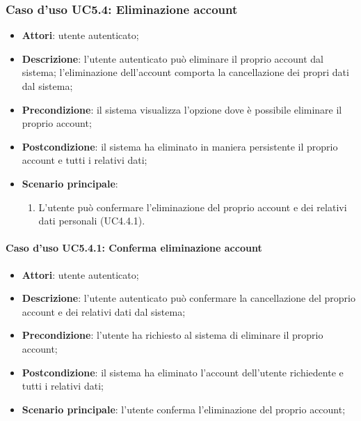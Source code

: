 \subsubsection{Caso d'uso UC5.4: Eliminazione account}

\begin{itemize}
	\item \textbf{Attori}: utente autenticato;
	\item \textbf{Descrizione}: l'utente autenticato può eliminare il proprio account dal sistema; l'eliminazione dell'account comporta la cancellazione dei propri dati dal sistema; 
	\item \textbf{Precondizione}: il sistema visualizza l'opzione dove è possibile eliminare il proprio account;
	\item \textbf{Postcondizione}: il sistema ha eliminato in maniera persistente il proprio account e tutti i relativi dati;
	\item \textbf{Scenario principale}:
		\begin{enumerate}
			\item L'utente può confermare l'eliminazione del proprio account e dei relativi dati personali (UC4.4.1).
		\end{enumerate}
\end{itemize}

\paragraph{Caso d'uso UC5.4.1: Conferma eliminazione account}

\begin{itemize}
	\item \textbf{Attori}: utente autenticato;
	\item \textbf{Descrizione}: l'utente autenticato può confermare la cancellazione del proprio account e dei relativi dati dal sistema;
	\item \textbf{Precondizione}: l'utente ha richiesto al sistema di eliminare il proprio account;
	\item \textbf{Postcondizione}: il sistema ha eliminato l'account dell'utente richiedente e tutti i relativi dati;
	\item \textbf{Scenario principale}: l'utente conferma l'eliminazione del proprio account;
\end{itemize}